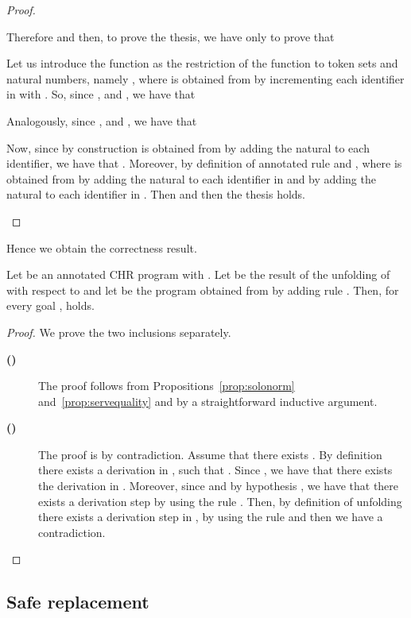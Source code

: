 \documentclass{tlp}
\begin{document}
\begin{proof}
\begin{description}
Therefore  and then, to prove the thesis, we have only to prove that 

Let us introduce the function  as
the restriction of the function  to token sets and natural numbers, namely
, where  is obtained from  by
incrementing each identifier in  with . So, since
,
 and
, we have that




Analogously, since ,
 and , we have that

Now, since by construction  is obtained from  by adding the natural  to each identifier, we have that .
Moreover, by definition of annotated rule 
and , where
 is obtained from  by adding the natural  to each identifier in
 and by adding the natural  to each identifier in
. Then  and then the thesis holds.
\end{description}
\end{proof}

\noindent Hence we obtain the correctness result. \\

\setcounter{proposition}{1}
\begin{proposition}
Let  be an annotated CHR program with
. Let   be the result
of the unfolding of  with respect to  and let  be the program
obtained from  by adding rule . Then, for every goal ,
 holds.
\end{proposition}
\setcounter{proposition}{6}

\begin{proof}
We prove the two inclusions separately.
\begin{description}
  \item[{\bf ()}] The proof follows from Propositions~\ref{prop:solonorm} and~\ref{prop:servequality} and by a straightforward inductive argument.
  \item[{\bf ()}]
  The proof is by contradiction. Assume that there exists . By definition there exists a derivation
   in , such that . Since , we have that there exists the derivation
 in . Moreover, since  and by hypothesis , we have that there exists a derivation step  by using the rule .
Then, by definition of unfolding there exists a derivation step  in , by using the rule  and then we have a contradiction.
\end{description}
\end{proof}





\subsection{Safe replacement}
\end{document}
